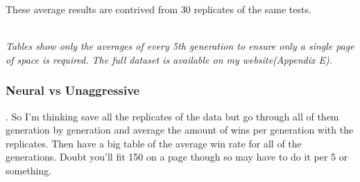 \documentclass[12pt,a4paper]{article}
\begin{document}
These average results are contrived from 30 replicates of the same tests. \\\\

\begin{small}
	\textit{Tables show only the averages of every 5th generation to ensure only a single page of space is required. The full dataset is available on my website(Appendix E).}
\end{small}


\subsubsection{Neural vs Unaggressive}
.
So I'm thinking save all the replicates of the data but go through all of them generation by generation and average the amount of wins per generation with the replicates. Then have a big table of the average win rate for all of the generations. Doubt you'll fit 150 on a page though so may have to do it per 5 or something.
\end{document}
